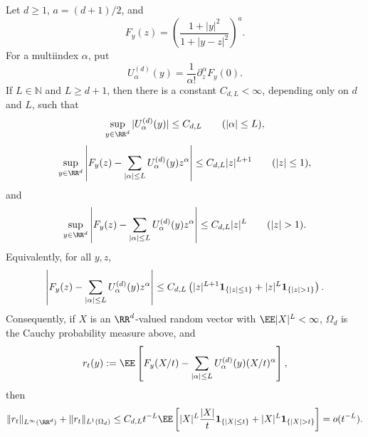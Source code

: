 \begin{lemma}%
\label{lem:global-multidim-quotient-remainder-core}
Let \(d\ge1\), \(a=(d+1)/2\), and
\[
F_y(z)=\left(\frac{1+|y|^2}{1+|y-z|^2}\right)^a .
\]
For a multiindex \(\alpha\), put
\[
U_\alpha^{(d)}(y)=\frac1{\alpha!}\partial_z^\alpha F_y(0).
\]
If \(L\in\mathbb N\) and \(L\ge d+1\), then there is a constant
\(C_{d,L}<\infty\), depending only on \(d\) and \(L\), such that
\begin{equation}\label{eq:multidim-coefficient-bound}
\sup_{y\in\RR^d}|U_\alpha^{(d)}(y)|\le C_{d,L}
\qquad (|\alpha|\le L),
\end{equation}
\begin{equation}\label{eq:multidim-small-translation-remainder}
\sup_{y\in\RR^d}\left|
F_y(z)-\sum_{|\alpha|\le L}U_\alpha^{(d)}(y)z^\alpha
\right|
\le C_{d,L}|z|^{L+1}
\qquad (|z|\le1),
\end{equation}
and
\begin{equation}\label{eq:multidim-large-translation-remainder}
\sup_{y\in\RR^d}\left|
F_y(z)-\sum_{|\alpha|\le L}U_\alpha^{(d)}(y)z^\alpha
\right|
\le C_{d,L}|z|^{L}
\qquad (|z|>1).
\end{equation}
Equivalently, for all \(y,z\),
\begin{equation}\label{eq:multidim-global-translation-remainder}
\left|
F_y(z)-\sum_{|\alpha|\le L}U_\alpha^{(d)}(y)z^\alpha
\right|
\le C_{d,L}\left(
|z|^{L+1}{\bf1}_{\{|z|\le1\}}
{}
+{}|z|^L{\bf1}_{\{|z|>1\}}
\right).
\end{equation}
Consequently, if \(X\) is an \(\RR^d\)-valued random vector with
\(\EE|X|^L<\infty\), \(\Omega_d\) is the Cauchy probability measure above,
and
\[
r_t(y):=\EE\left[
F_y(X/t)-\sum_{|\alpha|\le L}U_\alpha^{(d)}(y)(X/t)^\alpha
\right],
\]
then
\begin{equation}\label{eq:multidim-integrated-remainder-bound}
\|r_t\|_{L^\infty(\RR^d)}+\|r_t\|_{L^1(\Omega_d)}
\le C_{d,L}t^{-L}\EE\left[
|X|^L\frac{|X|}{t}{\bf1}_{\{|X|\le t\}}
{}
+{}|X|^L{\bf1}_{\{|X|>t\}}
\right]=o(t^{-L}).
\end{equation}
\end{lemma}

